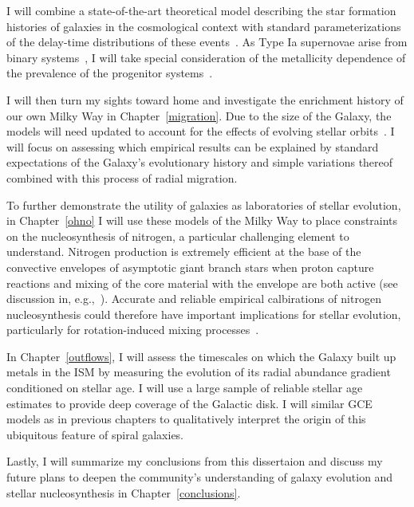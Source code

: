 \documentclass[main.tex]{subfiles}
\begin{document}
\begin{doublespace}
I will combine a state-of-the-art theoretical model describing the star
formation histories of galaxies in the cosmological context
\citep{Behroozi2019} with standard parameterizations of the delay-time
distributions of these events~\citep[e.g.,][]{Maoz2012a, Maoz2012b}.
As Type Ia supernovae arise from binary systems~\citep{Whelan1973, Iben1984,
Webbink1984}, I will take special consideration of the metallicity dependence
of the prevalence of the progenitor systems~\citep{Badenes2018, Moe2019}.
\par
I will then turn my sights toward home and investigate the enrichment history
of our own Milky Way in Chapter~\ref{migration}.
Due to the size of the Galaxy, the models will need updated to account for the
effects of evolving stellar orbits~\citep[e.g.,][]{Sellwood2002,
Schoenrich2009a}.
I will focus on assessing which empirical results can be explained by standard
expectations of the Galaxy's evolutionary history and simple variations thereof
combined with this process of radial migration.
\par
To further demonstrate the utility of galaxies as laboratories of stellar
evolution, in Chapter~\ref{ohno} I will use these models of the Milky Way
to place constraints on the nucleosynthesis of nitrogen, a particular
challenging element to understand.
Nitrogen production is extremely efficient at the base of the convective
envelopes of asymptotic giant branch stars when proton capture reactions and
mixing of the core material with the envelope are both active (see discussion
in, e.g.,~\citealt{Ventura2013}).
Accurate and reliable empirical calbirations of nitrogen nucleosynthesis could
therefore have important implications for stellar evolution, particularly for
rotation-induced mixing processes~\citep[e.g.,][]{Heger2010, Frischknecht2016}.
\par
In Chapter~\ref{outflows}, I will assess the timescales on which the
Galaxy built up metals in the ISM by measuring the evolution of its radial
abundance gradient conditioned on stellar age.
I will use a large sample of reliable stellar age estimates to provide deep
coverage of the Galactic disk.
I will similar GCE models as in previous chapters to qualitatively interpret
the origin of this ubiquitous feature of spiral galaxies.
\par
Lastly, I will summarize my conclusions from this dissertaion and discuss my
future plans to deepen the community's understanding of galaxy evolution and
stellar nucleosynthesis in Chapter~\ref{conclusions}.

\end{doublespace}
\end{document}
